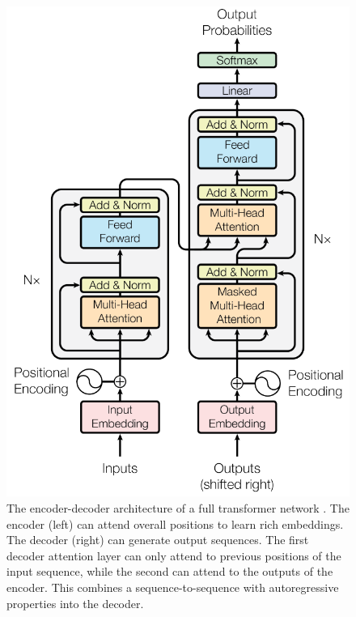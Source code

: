 \documentclass[../main.tex]{subfiles}
\begin{document}
\begin{figure}[t]
    \centering
    \includegraphics[scale=0.4]{include/images/transformer_architecture.png}
    \caption{
        The encoder-decoder architecture
        of a full transformer network \cite{Vaswani2017}.
        The encoder (left) can attend overall positions to learn rich embeddings.
        The decoder (right) can generate output sequences.
        The first decoder attention layer
        can only attend to previous positions of the input sequence,
        while the second can attend to the outputs of the encoder.
        This combines a sequence-to-sequence with
        autoregressive properties into the decoder.
    }
    \label{fig:transformer_arch}
\end{figure}
\end{document}
